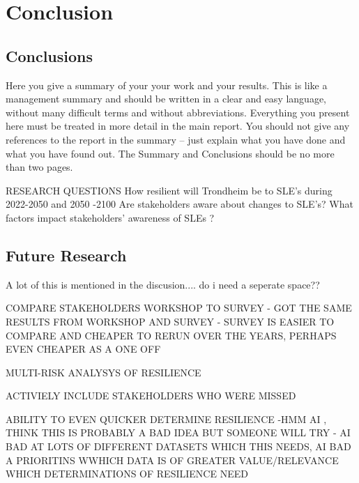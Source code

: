 
\chapter{Conclusion}
\section{Conclusions}
Here you give a summary of your your work and your results. This is like a management summary and should be written in a clear and easy language, without many difficult terms and without abbreviations. Everything you present here must be treated in more detail in the main report. You should not give any references to the report in the summary -- just explain what you have done and what you have found out. The Summary and Conclusions should be no more than two pages.

RESEARCH QUESTIONS
How resilient will Trondheim be to SLE’s during 2022-2050 and 2050 -2100
Are stakeholders aware about changes to SLE’s?
What factors impact stakeholders’ awareness of SLEs ?

\section{Future Research}
A lot of this is mentioned in the discusion.... do i need a seperate space??

COMPARE STAKEHOLDERS WORKSHOP TO SURVEY 
\cite{gerkensmeier_governing_2018} - GOT THE SAME RESULTS FROM WORKSHOP AND SURVEY - SURVEY IS EASIER TO COMPARE AND CHEAPER TO RERUN OVER THE YEARS, PERHAPS EVEN CHEAPER AS A ONE OFF

MULTI-RISK ANALYSYS OF RESILIENCE

ACTIVIELY INCLUDE STAKEHOLDERS WHO WERE MISSED 

ABILITY TO EVEN QUICKER DETERMINE RESILIENCE -HMM AI , THINK THIS IS PROBABLY A BAD IDEA BUT SOMEONE WILL TRY - AI BAD AT LOTS OF DIFFERENT DATASETS WHICH THIS NEEDS, AI BAD A PRIORITINS WWHICH DATA IS OF GREATER VALUE/RELEVANCE WHICH DETERMINATIONS OF RESILIENCE NEED
